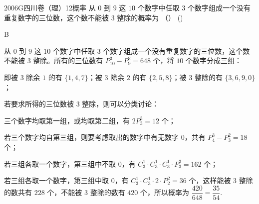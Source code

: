 
\begin{problem}{2006}{G}{四川卷（理）}{12}{概率}
从 $ 0 $ 到 $ 9 $ 这 $ 10 $ 个数字中任取 $ 3 $ 个数字组成一个没有重复数字的三位数，这个数不能被 $ 3 $ 整除的概率为 （\hspace{1cm}） (\hspace{1cm})
\begin{choices}
\end{choices}
\end{problem}

\begin{answer}
B
\end{answer}

\begin{solutions}
从 $ 0 $ 到 $ 9 $ 这 $ 10 $ 个数字中任取 $ 3 $ 个数字组成一个没有重复数字的三位数，这个数不能被 $ 3 $ 整除。所有的三位数有 $ P_{10}^{3}-P_{9}^{2}=648 $ 个，将 $ 10 $ 个数字分成三组：  

即被 $ 3 $ 除余 $ 1 $ 的有 $ \{1,4,7\} $；被 $ 3 $ 除余 $ 2 $ 的有 $ \{2,5,8\} $；被 $ 3 $ 整除的有 $ \{3,6,9,0\} $；  

若要求所得的三位数被 $ 3 $ 整除，则可以分类讨论：  

 三个数字均取第一组，或均取第二组，有 $ 2P_{3}^{3}=12 $ 个；  

 若三个数字均自第三组，则要考虑取出的数字中有无数字 $ 0 $，共有 $ P_{4}^{3}-P_{3}^{2}=18 $ 个；  

 若三组各取一个数字，第三组中不取 $ 0 $，有 $ C_{3}^{1}\cdot C_{3}^{1}\cdot C_{3}^{1}\cdot P_{3}^{3}=162 $ 个；  

 若三组各取一个数字，第三组中取 $ 0 $，有 $ C_{3}^{1}\cdot C_{3}^{1}\cdot 2\cdot P_{2}^{2}=36 $ 个，这样能被 $ 3 $ 整除的数共有 $ 228 $ 个，不能被 $ 3 $ 整除的数有 $ 420 $ 个，所以概率为 $ \dfrac{420}{648}=\dfrac{35}{54} $.  
\end{solutions}
